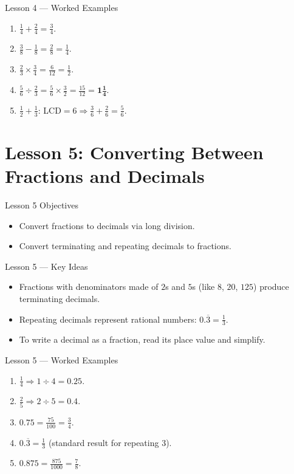 \documentclass[aspectratio=169]{beamer}
\begin{document}
\begin{frame}{Lesson 4 --- Worked Examples}
\begin{enumerate}
  \item $\frac{1}{4}+\frac{2}{4}=\frac{3}{4}$.
  \item $\frac{3}{8}-\frac{1}{8}=\frac{2}{8}=\frac{1}{4}$.
  \item $\frac{2}{3}\times\frac{3}{4}=\frac{6}{12}=\frac{1}{2}$.
  \item $\frac{5}{6}\div\frac{2}{3}=\frac{5}{6}\times\frac{3}{2}=\frac{15}{12}=\mathbf{1\frac{1}{4}}$.
  \item $\frac{1}{2}+\frac{1}{3}$: LCD$=6 \Rightarrow \frac{3}{6}+\frac{2}{6}=\frac{5}{6}$.
\end{enumerate}
\end{frame}

\section{Lesson 5: Converting Between Fractions and Decimals}
\begin{frame}{Lesson 5 Objectives}
\begin{itemize}
  \item Convert fractions to decimals via long division.
  \item Convert terminating and repeating decimals to fractions.
\end{itemize}
\end{frame}

\begin{frame}{Lesson 5 --- Key Ideas}
\begin{itemize}
  \item Fractions with denominators made of $2$s and $5$s (like $8$, $20$, $125$) produce terminating decimals.
  \item Repeating decimals represent rational numbers: $0.\overline{3}=\frac{1}{3}$.
  \item To write a decimal as a fraction, read its place value and simplify.
\end{itemize}
\end{frame}

\begin{frame}{Lesson 5 --- Worked Examples}
\begin{enumerate}
  \item $\frac{1}{4}\Rightarrow 1\div4=0.25$.
  \item $\frac{2}{5}\Rightarrow 2\div5=0.4$.
  \item $0.75=\frac{75}{100}=\frac{3}{4}$.
  \item $0.\overline{3}=\frac{1}{3}$ (standard result for repeating $3$).
  \item $0.875=\frac{875}{1000}=\frac{7}{8}$.
\end{enumerate}
\end{frame}
\end{document}
